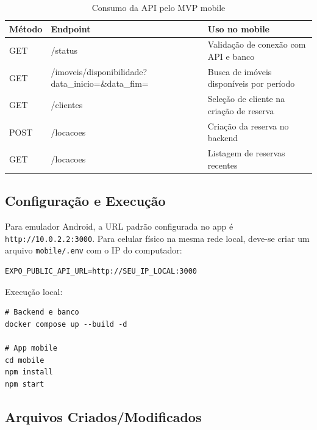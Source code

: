 \documentclass[12pt, a4paper]{article}
\newcommand{\thead}[1]{\cellcolor{tableheader}\color{white}\bfseries #1}
\newcommand{\talt}{\rowcolor{tablerowalt}}
\begin{document}
\begin{table}[H]
\centering
\begin{tabularx}{\textwidth}{|l|l|X|}
\hline
\thead{Método} & \thead{Endpoint} & \thead{Uso no mobile} \\
\hline
GET & /status & Validação de conexão com API e banco \\
\talt GET & /imoveis/disponibilidade?data\_inicio=\&data\_fim= & Busca de imóveis disponíveis por período \\
GET & /clientes & Seleção de cliente na criação de reserva \\
\talt POST & /locacoes & Criação da reserva no backend \\
GET & /locacoes & Listagem de reservas recentes \\
\hline
\end{tabularx}
\caption{Consumo da API pelo MVP mobile}
\end{table}

\subsection{Configuração e Execução}

Para emulador Android, a URL padrão configurada no app é \texttt{http://10.0.2.2:3000}. Para celular físico na mesma rede local, deve-se criar um arquivo \texttt{mobile/.env} com o IP do computador:

\begin{lstlisting}
EXPO_PUBLIC_API_URL=http://SEU_IP_LOCAL:3000
\end{lstlisting}

Execução local:

\begin{lstlisting}
# Backend e banco
docker compose up --build -d

# App mobile
cd mobile
npm install
npm start
\end{lstlisting}

\subsection{Arquivos Criados/Modificados}
\end{document}
